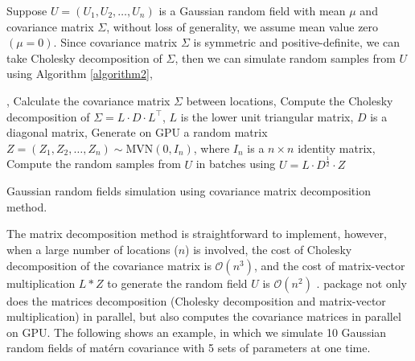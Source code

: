 \documentclass[article,nojss]{jss}\usepackage[]{graphicx}\usepackage[]{color}
\begin{document}
Suppose $U=(U_1, U_2, \dots, U_n)$ is a Gaussian random field with mean $\mu$ and covariance matrix $\Sigma$, without loss of generality, we assume mean value zero $(\mu = 0)$. Since covariance matrix $\Sigma$ is symmetric and positive-definite, we can take Cholesky decomposition of $\Sigma$, then we can simulate random samples from $U$ using Algorithm \ref{algorithm2},

\begin{algorithm*}[H] \label{algorithm2}
, Calculate the covariance matrix $\Sigma$ between locations, Compute the Cholesky decomposition of $\Sigma = L \cdot D \cdot L^\top$, $L$ is the lower unit triangular matrix, $D$ is a diagonal matrix, Generate on GPU a random matrix $Z=(Z_1, Z_2, \dots, Z_n) \sim \text{MVN}(0,I_n)$, where $I_n$ is a $n \times n$ identity matrix, Compute the random samples from $U$ in batches using $U = L \cdot D^{\frac{1}{2}} \cdot Z$ \;
 \caption{Gaussian random fields simulation using covariance matrix decomposition method.}
\end{algorithm*}

The matrix decomposition method is straightforward to implement, however, when a large number of locations ($n$) is involved, the cost of Cholesky decomposition of the covariance matrix is $\mathcal{O}(n^3)$,  and the cost of matrix-vector multiplication $L*Z$ to generate the random field $U$ is $\mathcal{O}(n^2)$ \citep{LiuandLi2019}.   package not only does the matrices decomposition (Cholesky decomposition and matrix-vector multiplication) in parallel, but also computes the covariance matrices in parallel on GPU. The following shows an example, in which we simulate 10 Gaussian random fields of mat\'ern covariance with 5 sets of parameters at one time. %
\end{document}
